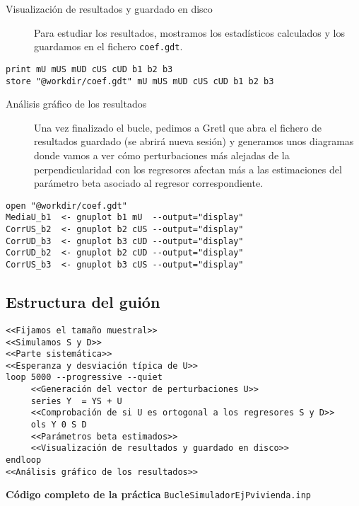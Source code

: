\documentclass[11pt]{article}
\begin{document}
\begin{description}
\item[{Visualización de resultados y guardado en disco}] Para estudiar los
resultados, mostramos los estadísticos calculados y los guardamos en
el fichero \texttt{coef.gdt}.
\end{description}
\begin{verbatim}
print mU mUS mUD cUS cUD b1 b2 b3
store "@workdir/coef.gdt" mU mUS mUD cUS cUD b1 b2 b3
\end{verbatim}

\begin{description}
\item[{Análisis gráfico de los resultados}] Una vez finalizado el bucle,
pedimos a Gretl que abra el fichero de resultados guardado (se
abrirá nueva sesión) y generamos unos diagramas donde vamos a ver
cómo perturbaciones más alejadas de la perpendicularidad con los
regresores afectan más a las estimaciones del parámetro beta
asociado al regresor correspondiente.
\end{description}
\begin{verbatim}
open "@workdir/coef.gdt"
MediaU_b1  <- gnuplot b1 mU  --output="display"
CorrUS_b2  <- gnuplot b2 cUS --output="display"
CorrUD_b3  <- gnuplot b3 cUD --output="display"
CorrUD_b2  <- gnuplot b2 cUD --output="display"
CorrUS_b3  <- gnuplot b3 cUS --output="display"
\end{verbatim}

\subsection{Estructura del guión}
\label{sec:org15e73c1}

\begin{verbatim}
<<Fijamos el tamaño muestral>>
<<Simulamos S y D>>
<<Parte sistemática>>
<<Esperanza y desviación típica de U>>
loop 5000 --progressive --quiet
     <<Generación del vector de perturbaciones U>>
     series Y  = YS + U
     <<Comprobación de si U es ortogonal a los regresores S y D>>
     ols Y 0 S D
     <<Parámetros beta estimados>>
     <<Visualización de resultados y guardado en disco>>
endloop
<<Análisis gráfico de los resultados>>
\end{verbatim}

\noindent
\textbf{Código completo de la práctica} \texttt{BucleSimuladorEjPvivienda.inp}
\vspace{10pt}

\clearpage
\end{document}
